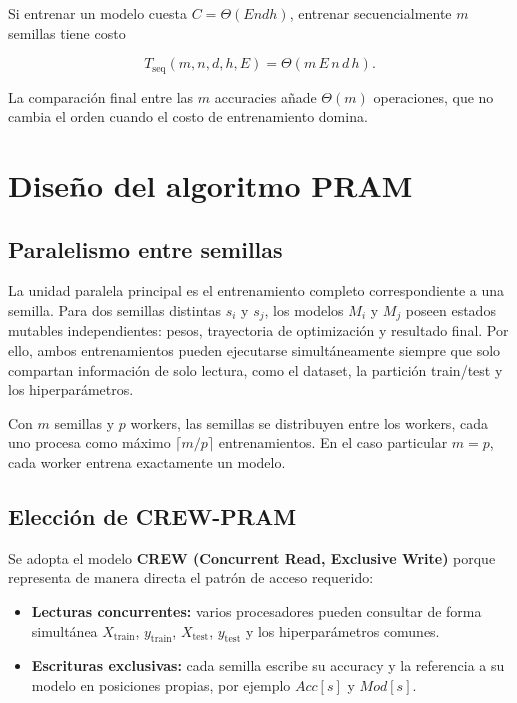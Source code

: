 \documentclass[11pt,a4paper]{article}
\newcommand{\Tseq}{T_{\mathrm{seq}}}
\newcommand{\Cost}{C}
\begin{document}
Si entrenar un modelo cuesta $\Cost=\Theta(E n d h)$, entrenar secuencialmente
$m$ semillas tiene costo

\begin{equation}
    \Tseq(m,n,d,h,E)=\Theta(m\,E\,n\,d\,h).
    \label{eq:tseq-general}
\end{equation}

La comparación final entre las $m$ accuracies añade $\Theta(m)$ operaciones, que no
cambia el orden cuando el costo de entrenamiento domina.

\section{Diseño del algoritmo PRAM}

\subsection{Paralelismo entre semillas}

La unidad paralela principal es el entrenamiento completo correspondiente a una semilla.
Para dos semillas distintas $s_i$ y $s_j$, los modelos $M_i$ y $M_j$ poseen estados
mutables independientes: pesos, trayectoria de optimización y resultado final. Por ello,
ambos entrenamientos pueden ejecutarse simultáneamente siempre que solo compartan
información de solo lectura, como el dataset, la partición train/test y los hiperparámetros.

Con $m$ semillas y $p$ workers, las semillas se distribuyen entre los workers, cada uno
procesa como máximo $\lceil m/p\rceil$ entrenamientos. En el caso particular $m=p$,
cada worker entrena exactamente un modelo.

\subsection{Elección de CREW-PRAM}

Se adopta el modelo \textbf{CREW (Concurrent Read, Exclusive Write)} porque representa
de manera directa el patrón de acceso requerido:

\begin{itemize}[leftmargin=*]
    \item \textbf{Lecturas concurrentes:} varios procesadores pueden consultar de forma
    simultánea $X_{\mathrm{train}}$, $y_{\mathrm{train}}$, $X_{\mathrm{test}}$,
    $y_{\mathrm{test}}$ y los hiperparámetros comunes.
    \item \textbf{Escrituras exclusivas:} cada semilla escribe su accuracy y la referencia
    a su modelo en posiciones propias, por ejemplo $Acc[s]$ y $Mod[s]$.
\end{itemize}
\end{document}
